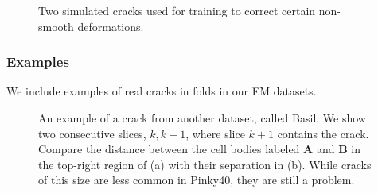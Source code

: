 \documentclass{article}
\begin{document}
\begin{figure}[htp]
    \centering
    \caption{Two simulated cracks used for training to correct certain non-smooth deformations.}
    \label{simulatedcracks}
\end{figure}

\subsubsection{Examples}
We include examples of real cracks in folds in our EM datasets.

\begin{figure}[htp]
	\centering
	\caption[Example of a crack in the Basil EM dataset]{An example of a crack from another dataset, called Basil. We show two consecutive slices, $k,k+1$, where slice $k+1$ contains the crack. Compare the distance between the cell bodies labeled \textbf{A} and \textbf{B} in the top-right region of (a) with their separation in (b). While cracks of this size are less common in Pinky40, they are still a problem.}\label{cracks}
\end{figure}
\end{document}
